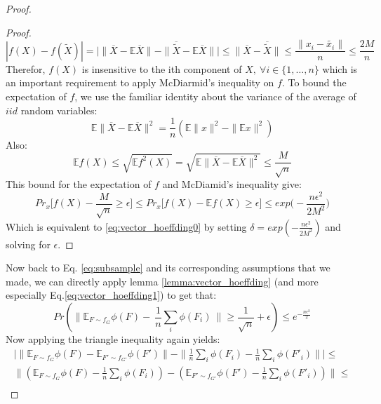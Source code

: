 \documentclass{article}
\begin{document}
\begin{proof}
\begin{proof}
\begin{equation}
    |f(X)-f(\widetilde{X})|=\Big|\| \overline{X}-\mathbb{E}\overline{X} \|-\|\overline{\widetilde{X}} - \mathbb{E}\overline{X}  \| \Big|\leq \| \overline{X} - \overline{\widetilde{X}}\|\leq
    \frac{\|x_i - \widetilde{x_i} \|}{n}\leq
    \frac{2M}{n}
\end{equation}
Therefor, $f(X)$ is insensitive to the ith component of $X,~ \forall i \in \{1,\ldots,n\}$ which is an important requirement to apply McDiarmid's inequality on $f$. \newline
To bound the expectation of $f$, we use the familiar identity about the variance of the average of $iid$ random variables:
\begin{equation}
\mathbb{E}\|\overline{X}-\mathbb{E}\overline{X}\|^2=\frac{1}{n}(\mathbb{E}\|x\|^2-\|\mathbb{E}x\|^2 ) 
\end{equation}
Also:
\[ \mathbb{E}f(X)\leq\sqrt{\mathbb{E}f^2(X)}=\sqrt{\mathbb{E}\|\overline{X}-\mathbb{E}\overline{X}\|^2}\leq \frac{M}{\sqrt{n}}\]
This bound for the expectation of $f$ and McDiamid's inequality give: 
\begin{equation}
\label{eq:vector_hoeffding1}
    Pr_x \Big [ f(X)-\frac{M}{\sqrt{n}}\geq \epsilon \Big ]\leq
    Pr_x \Big [ f(X)-\mathbb{E}f(X)\geq \epsilon \Big ]\leq
    exp\Big( -\frac{n\epsilon^2}{2M^2}\Big)
\end{equation}
Which is equivalent to \eqref{eq:vector_hoeffding0} by setting $\delta=exp( -\frac{n\epsilon^2}{2M^2})$ and solving for $\epsilon$.
\end{proof}
Now back to Eq. \eqref{eq:subsample} and its corresponding assumptions that we made, we can directly apply lemma \ref{lemma:vector_hoeffding} (and more especially Eq.\eqref{eq:vector_hoeffding1}) to get that:
\begin{equation}
    \label{eq:fixed_w}
    Pr(\|\mathbb{E}_{F \sim f_G} \phi(F)-~\frac{1}{n} \sum_i \phi(F_i)~\|\geq \frac{1}{\sqrt{n}}+\epsilon)\leq
    e^{-\frac{n\epsilon^2}{2}}
\end{equation}
Now applying the triangle inequality again yields:
\begin{align*}
    \Big | \| \mathbb{E}_{F \sim f_G} \phi(F) - \mathbb{E}_{F' \sim f_{G'}} \phi(F')\| - \| \frac{1}{n} \sum_i \phi(F_i) - \frac{1}{n} \sum_i \phi(F'_i)\|\Big | \leq  \\
   \| (\mathbb{E}_{F \sim f_G} \phi(F) -  \frac{1}{n} \sum_i \phi(F_i) )- (\mathbb{E}_{F' \sim f_{G'}} \phi(F') - \frac{1}{n} \sum_i \phi(F'_i))\|\leq \\

\end{align*}
\end{proof}
\end{document}
